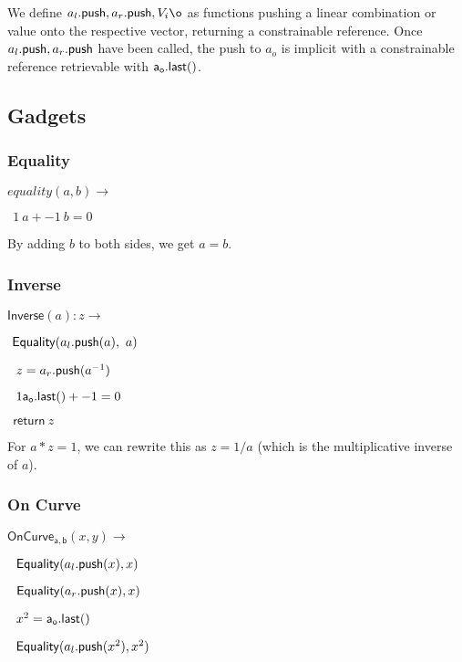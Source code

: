 \documentclass[]{article}
\begin{document}
	We define $\al, \ar, V_i\o$ as functions pushing a linear combination or value onto the respective vector, returning a constrainable reference. Once $a_l\mathsf{.push}, a_r\mathsf{.push}$ have been called, the push to $a_o$ is implicit with a constrainable reference retrievable with $\mathsf{a_o.last()}$.
	
	\newcommand{\all}{\mathsf{a_l.last()}}
	\newcommand{\arl}{\mathsf{a_r.last()}}
	
	\subsection{Gadgets}
	
	\subsubsection{Equality}
	
	\newcommand{\equality}{\mathsf{Equality}}
	
	$equality(a, b) \rightarrow$
	
	$~~1 ~a + -1 ~b = 0$
	
	By adding $b$ to both sides, we get $a = b$.
	
	\subsubsection{Inverse}
	
	\newcommand{\inverse}{\mathsf{Inverse}}
	
	$\inverse(a): z \rightarrow$
	
	$~\equality(\al(a), ~a)$
	
	$~~z = a_r\mathsf{.push}(a^{-1})$
	
	$~~1 \mathsf{a_o.last()} + -1 = 0$
	
	$~~\mathsf{return} ~z$
	
	For $a * z = 1$, we can rewrite this as $z = 1/a$ (which is the multiplicative inverse of $a$).

	\subsubsection{On Curve}
	
	\newcommand{\oncurve}{\mathsf{OnCurve_{a,b}}}
	
	$\oncurve(x, y) \rightarrow$
	
	$~~\equality(\al(x), x)$
	
	$~~\equality(\ar(x), x)$
	
	$~~x^2 = \mathsf{a_o.last()}$
	
	$~~\equality(\al(x^2), x^2)$
	
\end{document}
